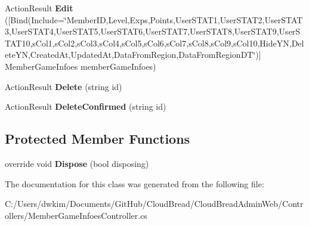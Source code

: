\begin{DoxyCompactItemize}
\item 
Action\+Result {\bfseries Edit} (\mbox{[}Bind(Include=\char`\"{}Member\+ID,Level,Exps,Points,User\+S\+T\+A\+T1,User\+S\+T\+A\+T2,User\+S\+T\+A\+T3,User\+S\+T\+A\+T4,User\+S\+T\+A\+T5,User\+S\+T\+A\+T6,User\+S\+T\+A\+T7,User\+S\+T\+A\+T8,User\+S\+T\+A\+T9,User\+S\+T\+A\+T10,s\+Col1,s\+Col2,s\+Col3,s\+Col4,s\+Col5,s\+Col6,s\+Col7,s\+Col8,s\+Col9,s\+Col10,Hide\+YN,Delete\+YN,Created\+At,Updated\+At,Data\+From\+Region,Data\+From\+Region\+DT\char`\"{})\mbox{]} Member\+Game\+Infoes member\+Game\+Infoes)\hypertarget{a00138_a6b3ef646ef34b2a6b8cbf66425c681de}{}\label{a00138_a6b3ef646ef34b2a6b8cbf66425c681de}

\item 
Action\+Result {\bfseries Delete} (string id)\hypertarget{a00138_a500fe8df38d4420b6454bd46b1c5f5eb}{}\label{a00138_a500fe8df38d4420b6454bd46b1c5f5eb}

\item 
Action\+Result {\bfseries Delete\+Confirmed} (string id)\hypertarget{a00138_aea595468488daa717a95d375eb5badfb}{}\label{a00138_aea595468488daa717a95d375eb5badfb}

\end{DoxyCompactItemize}
\subsection*{Protected Member Functions}
\begin{DoxyCompactItemize}
\item 
override void {\bfseries Dispose} (bool disposing)\hypertarget{a00138_a5c78044ff2101b2964c9edf001332d54}{}\label{a00138_a5c78044ff2101b2964c9edf001332d54}

\end{DoxyCompactItemize}


The documentation for this class was generated from the following file\+:\begin{DoxyCompactItemize}
\item 
C\+:/\+Users/dwkim/\+Documents/\+Git\+Hub/\+Cloud\+Bread/\+Cloud\+Bread\+Admin\+Web/\+Controllers/Member\+Game\+Infoes\+Controller.\+cs\end{DoxyCompactItemize}
